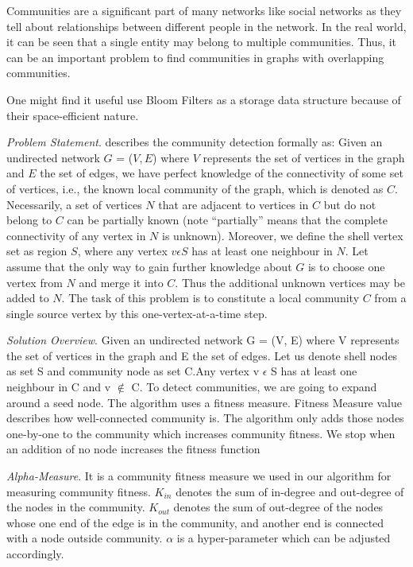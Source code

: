\documentclass[a4paper]{article}
\begin{document}
Communities are a significant part of many networks like social networks as they tell about relationships between different people in the network. In the real world, it can be seen that a single entity may belong to multiple communities. Thus, it can be an important problem to find communities in graphs with overlapping communities. \newline

One might find it useful use Bloom Filters as a storage data structure because of their space-efficient nature. 

\textit{Problem Statement}. \cite{Wu2012} describes the community detection formally as: Given an undirected network $G$ = ($V, E$) where $V$ represents the set of vertices in the graph and $E$ the set of edges, we have perfect knowledge of the connectivity of some set of vertices, i.e., the known local community of the graph, which is denoted as $C$. Necessarily, a set of vertices $N$ that are adjacent to vertices in $C$ but do not belong to $C$ can be partially known (note “partially” means that the complete connectivity of any vertex in $N$ is unknown). Moreover, we define the shell vertex set as region $S$, where any vertex $v \epsilon S$ has at least one neighbour in $N$. Let assume that the only way to gain further knowledge about $G$ is to choose one vertex from $N$ and merge it into $C$. Thus the additional unknown vertices may be added to $N$. The task of this problem is to constitute a local community $C$ from a single source vertex by this one-vertex-at-a-time step.\newline


\textit{Solution Overview}. Given an undirected network G = (V, E) where V represents the set of vertices in the graph and E the set of edges. Let us denote shell nodes as set S and community node as set C.Any vertex v $\epsilon$ S has at least one neighbour in C and v $\not\in$ C. \newline
To detect communities, we are going to expand around a seed node. The algorithm uses a fitness measure. Fitness Measure value describes how well-connected community is. The algorithm only adds those nodes one-by-one to the community which increases community fitness. We stop when an addition of no node increases the fitness function\newline


\textit{Alpha-Measure}\cite{lancichinetti:2008}. It is a community fitness measure we used in our algorithm for measuring community fitness.\newline
$K_{in}$ denotes the sum of in-degree and out-degree of the nodes in the community.
$K_{out}$ denotes the sum of out-degree of the nodes whose one end of the edge is in the community, and another end is connected with a node outside community.\newline
$\alpha$ is a hyper-parameter which can be adjusted accordingly.
\end{document}
